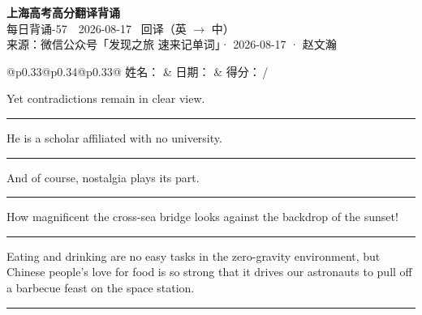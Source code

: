 \documentclass[11pt,a4paper]{article}
\newcommand{\num}[1]{\makebox[1.9em][r]{#1.}\hspace{0.3em}}
\newcommand{\wline}{\noindent\rule{\linewidth}{0.4pt}}
\begin{document}
\pagestyle{plain}
\begin{center}
{\LARGE\bfseries 上海高考高分翻译背诵 }\\[0.25em]
{\large 每日背诵-57　2026-08-17 \quad\ 回译（英 $\to$ 中）}\\[0.35em]
{\footnotesize 来源：微信公众号「发现之旅 速来记单词」· 2026-08-17 · 赵文瀚}
\end{center}

\vspace{0.4em}
\noindent\begin{tabular}{@{}p{0.33\textwidth}@{}p{0.34\textwidth}@{}p{0.33\textwidth}@{}}
姓名：\underline{\hspace{2.0cm}} & 日期：\underline{\hspace{2.0cm}} & 得分：\underline{\hspace{1.4cm}}\,/ \\
\end{tabular}

\vspace{0.5em}

\vspace{0.8em}
\num{1}Yet contradictions remain in clear view.

\vspace{0.25em}

\wline

\num{2}He is a scholar affiliated with no university.

\vspace{0.25em}

\wline

\num{3}And of course, nostalgia plays its part.

\vspace{0.25em}

\wline

\num{4}How magnificent the cross-sea bridge looks against the backdrop of the sunset!

\vspace{0.25em}

\wline

\num{5}Eating and drinking are no easy tasks in the zero-gravity environment, but Chinese people’s love for food is so strong that it drives our astronauts to pull off a barbecue feast on the space station.

\vspace{0.25em}

\wline
\end{document}
